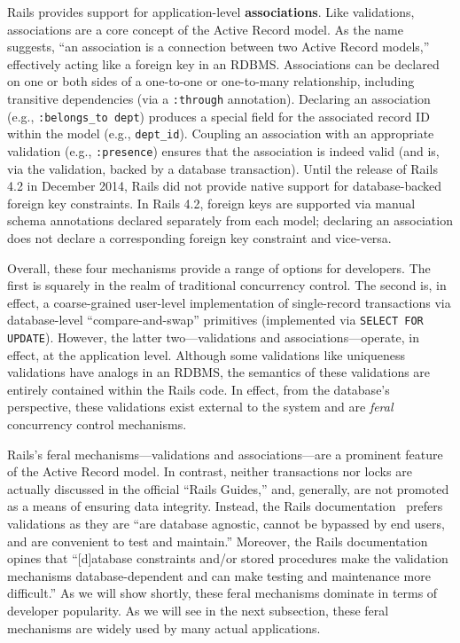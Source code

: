 \begin{myenumerate}
\item Rails provides support for application-level
  \textbf{associations}. Like validations, associations are a core
  concept of the Active Record model. As the name suggests, ``an
  association is a connection between two Active Record models,''
  effectively acting like a foreign key in an RDBMS. Associations can
  be declared on one or both sides of a one-to-one or one-to-many
  relationship, including transitive dependencies (via a
  \texttt{:through} annotation). Declaring an association (e.g.,
  \texttt{:belongs\_to dept}) produces a special field for the
  associated record ID within the model (e.g.,
  \texttt{dept\_id}). Coupling an association with an appropriate
  validation (e.g., \texttt{:presence}) ensures that the association
  is indeed valid (and is, via the validation, backed by a database
  transaction). Until the release of Rails 4.2 in December 2014, Rails
  did not provide native support for database-backed foreign key
  constraints. In Rails 4.2, foreign keys are supported via manual
  schema annotations declared separately from each model; declaring an
  association does not declare a corresponding foreign key constraint
  and vice-versa.
\end{myenumerate}

Overall, these four mechanisms provide a range of options for
developers. The first is squarely in the realm of traditional
concurrency control. The second is, in effect, a coarse-grained
user-level implementation of single-record transactions via
database-level ``compare-and-swap'' primitives (implemented via
\texttt{SELECT FOR UPDATE}). However, the latter two---validations and
associations---operate, in effect, at the application level. Although
some validations like uniqueness validations have analogs in an RDBMS,
the semantics of these validations are entirely contained within the
Rails code. In effect, from the database's perspective, these
validations exist external to the system and are \textit{feral}
concurrency control mechanisms.

Rails's feral mechanisms---validations and associations---are a
prominent feature of the Active Record model. In contrast, neither
transactions nor locks are actually discussed in the official ``Rails
Guides,'' and, generally, are not promoted as a means of ensuring data
integrity. Instead, the Rails documentation~\cite{rails-guide} prefers
validations as they are ``are database agnostic, cannot be bypassed by
end users, and are convenient to test and maintain.'' Moreover, the
Rails documentation opines that ``[d]atabase constraints and/or stored
procedures make the validation mechanisms database-dependent and can
make testing and maintenance more difficult.''  As we will show
shortly, these feral mechanisms dominate in terms of developer
popularity. As we will see in the next subsection, these feral
mechanisms are widely used by many actual applications.

